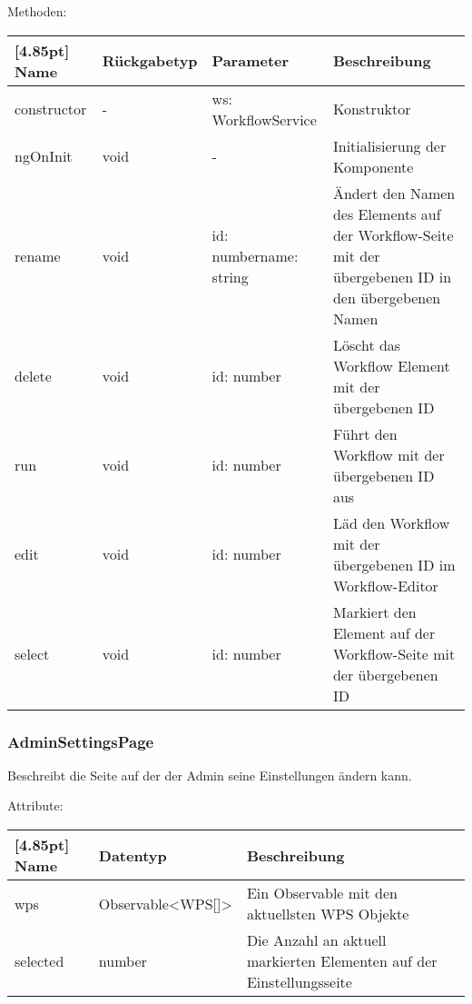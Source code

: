 			Methoden:
			\begin{center}
			\setlength\tabcolsep{5pt}
				\renewcommand{\arraystretch}{1.5}
					\begin{tabularx}{\textwidth}{|l|l|p{38mm}|X|}
					\hline
					\rowcolor[gray]{0.75}[4.85pt]
					Name & Rückgabetyp & Parameter & Beschreibung \\ \hline
					constructor & - & ws: WorkflowService & Konstruktor \\ \hline
					ngOnInit & void & - & Initialisierung der Komponente \\ \hline
					rename & void & id: number\newline name: string & Ändert den Namen des Elements auf der Workflow-Seite mit der übergebenen ID in den übergebenen Namen \\ \hline
					delete & void & id: number & Löscht das Workflow Element mit der übergebenen ID \\ \hline
					run & void & id: number & Führt den Workflow mit der übergebenen ID aus \\ \hline
					edit & void & id: number & Läd den Workflow mit der übergebenen ID im Workflow-Editor \\ \hline
					select & void & id: number & Markiert den Element auf der Workflow-Seite mit der übergebenen ID \\ \hline
					\end{tabularx}
			\end{center}

\newpage

			\subsubsection{AdminSettingsPage}
			
			Beschreibt die Seite auf der der Admin seine Einstellungen ändern kann.\newline
			
				Attribute:
				\begin{center}
					\renewcommand{\arraystretch}{1.5}
					\setlength\tabcolsep{5pt}
					\begin{tabularx}{\textwidth}{|l|l|X|}
						\hline
						\rowcolor[gray]{0.75}[4.85pt]					
						Name & Datentyp & Beschreibung \\ \hline
						wps & Observable<WPS[]> & Ein Observable mit den aktuellsten WPS Objekte \\ \hline
						selected & number & Die Anzahl an aktuell markierten Elementen auf der Einstellungsseite \\ \hline
					\end{tabularx}
				\end{center}
				
